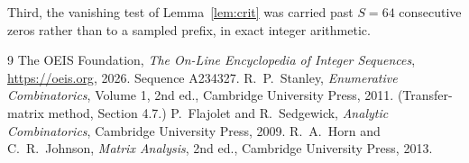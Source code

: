 \documentclass[11pt,a4paper]{article}
\theoremstyle{plain}
\theoremstyle{definition}
\begin{document}
Third, the vanishing test of Lemma~\ref{lem:crit} was carried past $S=64$ consecutive
zeros rather than to a sampled prefix, in exact integer arithmetic.

\begin{thebibliography}{9}
 The OEIS Foundation, \emph{The On-Line Encyclopedia of Integer
Sequences}, \url{https://oeis.org}, 2026. Sequence A234327.
 R.~P.~Stanley, \emph{Enumerative Combinatorics}, Volume 1, 2nd ed.,
Cambridge University Press, 2011. (Transfer-matrix method, Section 4.7.)
 P.~Flajolet and R.~Sedgewick, \emph{Analytic Combinatorics}, Cambridge
University Press, 2009.
 R.~A.~Horn and C.~R.~Johnson, \emph{Matrix Analysis}, 2nd ed., Cambridge
University Press, 2013.
\end{thebibliography}
\end{document}
